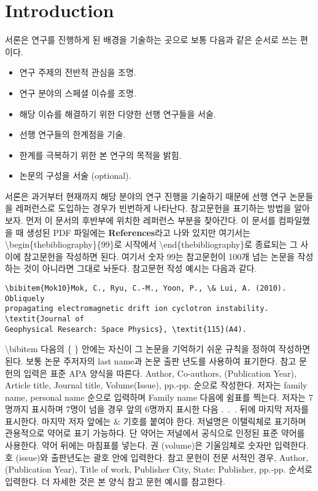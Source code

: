 \section{Introduction}

서론은 연구를 진행하게 된 배경을 기술하는 곳으로 보통 다음과 같은 순서로 쓰는 편이다.
\begin{itemize}
\item{연구 주제의 전반적 관심을 조명.}
\item{연구 분야의 스페셜 이슈를 조명.}
\item{해당 이슈를 해결하기 위한 다양한 선행 연구들을 서술.}
\item{선행 연구들의 한계점을 기술.}
\item{한계를 극복하기 위한 본 연구의 목적을 밝힘.}
\item{논문의 구성을 서술 (optional).}
\end{itemize}
서론은 과거부터 현재까지 해당 분야의 연구 진행을 기술하기 때문에 선행 연구 논문들을 레퍼런스로 도입하는 경우가 빈번하게 나타난다.  참고문헌을 표기하는 방법을 알아보자. 먼저 이 문서의 후반부에 위치한 레퍼런스 부분을 찾아간다. 이 문서를 컴파일했을 때 생성된 PDF 파일에는 {\bf References}라고 나와 있지만 여기서는 {\textbackslash}begin\{thebibliography\}\{99\}로 시작에서 {\textbackslash}end\{thebibliography\}로 종료되는 그 사이에 참고문헌을 작성하면 된다. 여기서 숫자 99는 참고문헌이 100개 넘는 논문을 작성하는 것이 아니라면 그대로 놔둔다. 참고문헌 작성 예시는 다음과 같다.
\cite{Yoon06}
\begin{lstlisting}[breaklines=false]
\bibitem{Mok10}Mok, C., Ryu, C.-M., Yoon, P., \& Lui, A. (2010). Obliquely 
propagating electromagnetic drift ion cyclotron instability. \textit{Journal of 
Geophysical Research: Space Physics}, \textit{115}(A4).
\end{lstlisting}
{\textbackslash}bibitem 다음의 \{ \} 안에는 자신이 그 논문을 기억하기 쉬운 
규칙을 정하여 작성하면 된다. 보통 논문 주저자의 last name과 논문 출판 년도를 
사용하여 표기한다.
참고 문헌의 입력은 표준 APA 양식을 따른다. Author, Co-authors, (Publication 
Year), Article title, Journal title, Volume(Issue), pp.-pp. 순으로 작성한다. 
저자는 family name, personal name 순으로 입력하며 Family name 다음에 쉼표를 
찍는다. 저자는 7명까지 표시하며 7명이 넘을 경우 앞의 6명까지 표시한 다음 .~.~. 
뒤에 마지막 저자를 표시한다. 마지막 저자 앞에는 \& 기호를 붙여야 한다. 저널명은 
이탤릭체로 표기하며 관용적으로 약어로 표기 가능하다. 단 약어는 저널에서 
공식으로 인정된 표준 약어를 사용한다. 약어 뒤에는 마침표를 넣는다. 권 
(volume)은 기울임체로 숫자만 입력한다. 호 (issue)와 출판년도는 괄호 안에 
입력한다. 참고 문헌이 전문 서적인 경우, Author, (Publication Year), Title of 
work, Publisher City, State: Publisher, pp.-pp. 순서로 입력한다. 더 자세한 것은 
본 양식 참고 문헌 예시를 참고한다.


